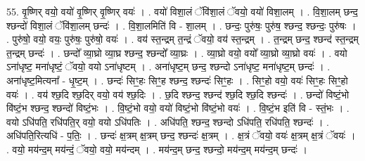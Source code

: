 \documentclass[17pt]{extarticle}
\begin{document}
55. वृ॒ष्णिर् वयो॒ वयो॑ वृ॒ष्णिर् वृ॒ष्णिर् वयः॑ । . वयो॑ विशा॒लं ॅवि॑शा॒लं ॅवयो॒ वयो॑ विशा॒लम् । . वि॒शा॒लम् छन्द॒ श्छन्दो॑ विशा॒लं ॅवि॑शा॒लम् छन्दः॑ । . वि॒शा॒लमिति॑ वि - शा॒लम् । . छन्दः॒ पुरु॑षः॒ पुरु॑ष॒ श्छन्द॒ श्छन्दः॒ पुरु॑षः । . पुरु॑षो॒ वयो॒ वयः॒ पुरु॑षः॒ पुरु॑षो॒ वयः॑ । . वय॑ स्त॒न्द्रम् त॒न्द्रं ॅवयो॒ वय॑ स्त॒न्द्रम् । . त॒न्द्रम् छन्द॒ श्छन्द॑ स्त॒न्द्रम् त॒न्द्रम् छन्दः॑ । . छन्दो᳚ व्या॒घ्रो व्या॒घ्र श्छन्द॒ श्छन्दो᳚ व्या॒घ्रः । . व्या॒घ्रो वयो॒ वयो᳚ व्या॒घ्रो व्या॒घ्रो वयः॑ । . वयो ऽना॑धृष्ट॒ मना॑धृष्टं॒ ॅवयो॒ वयो ऽना॑धृष्टम् । . अना॑धृष्ट॒म् छन्द॒ श्छन्दो ऽना॑धृष्ट॒ मना॑धृष्ट॒म् छन्दः॑ । . अना॑धृष्ट॒मित्यना᳚ - धृ॒ष्ट॒म् । . छन्दः॑ सिꣳ॒॒हः सिꣳ॒॒ह श्छन्द॒ श्छन्दः॑ सिꣳ॒॒हः । . सिꣳ॒॒हो वयो॒ वयः॑ सिꣳ॒॒हः सिꣳ॒॒हो वयः॑ । . वय॑ श्छ॒दि श्छ॒दिर् वयो॒ वय॑ श्छ॒दिः । . छ॒दि श्छन्द॒ श्छन्द॑ श्छ॒दि श्छ॒दि श्छन्दः॑ । . छन्दो॑ विष्टं॒भो वि॑ष्टं॒भ श्छन्द॒ श्छन्दो॑ विष्टं॒भः । . वि॒ष्टं॒भो वयो॒ वयो॑ विष्टं॒भो वि॑ष्टं॒भो वयः॑ । . वि॒ष्टं॒भ इति॑ वि - स्तं॒भः । . वयो ऽधि॑पति॒ रधि॑पति॒र् वयो॒ वयो ऽधि॑पतिः । . अधि॑पति॒ श्छन्द॒ श्छन्दो ऽधि॑पति॒ रधि॑पति॒ श्छन्दः॑ । . अधि॑पति॒रित्यधि॑ - प॒तिः॒ । . छन्दः॑ क्ष॒त्रम् क्ष॒त्रम् छन्द॒ श्छन्दः॑ क्ष॒त्रम् । . क्ष॒त्रं ॅवयो॒ वयः॑ क्ष॒त्रम् क्ष॒त्रं ॅवयः॑ । . वयो॒ मय॑न्द॒म् मय॑न्दं॒ ॅवयो॒ वयो॒ मय॑न्दम् । . मय॑न्द॒म् छन्द॒ श्छन्दो॒ मय॑न्द॒म् मय॑न्द॒म् छन्दः॑ । \newline
\end{document}

